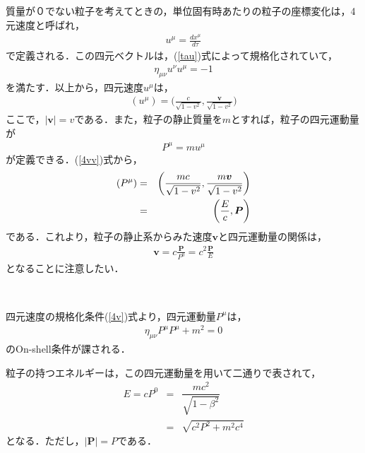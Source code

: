 質量が０でない粒子を考えてときの，単位固有時あたりの粒子の座標変化は，4元速度と呼ばれ，
\begin{eqnarray}
u^{\mu}=\frac{dx^{\mu}}{d\tau}
\end{eqnarray}
で定義される．この四元ベクトルは，(\ref{tau})式によって規格化されていて，
\begin{eqnarray}
\label{4v}
\eta_{\mu\nu}u^{\nu}u^{\mu}=-1
\end{eqnarray}
を満たす．以上から，四元速度$u^{\mu}$は，
\begin{eqnarray}
\label{4vv}
(u^{\mu})=\biggl(\frac{c}{\sqrt{1-v^2}},\frac{\bm{v}}{{\sqrt{1-v^2}}}\biggr)
\end{eqnarray}
ここで，$|\bm{v}|=v$である．また，粒子の静止質量を$m$とすれば，粒子の四元運動量が
\begin{eqnarray}
P^{\mu}=mu^{\mu}
\end{eqnarray}
が定義できる．(\ref{4vv})式から，
\begin{eqnarray}
(P^{\mu})&=&\biggl(\frac{mc}{\sqrt{1-v^2}},\frac{m\bm{v}}{{\sqrt{1-v^2}}}\biggr)  \vspace{4mm} \\
&=&\biggl(\dfrac{E}{c},\bm{P}\biggr)
\end{eqnarray}
である．これより，粒子の静止系からみた速度$\bm{v}$と四元運動量の関係は，
\begin{eqnarray}
\label{vp}
\bm{v}=c\frac{\bm{P}}{P^{0}}=c^2\frac{\bm{P}}{E}
\end{eqnarray}
となることに注意したい．
\begin{empheqboxed}
\

四元速度の規格化条件(\ref{4v})式より，四元運動量$P^{\mu}$は，
\begin{eqnarray}
\label{OS}
\eta_{\mu\nu}P^{\mu}P^{\mu}+m^2=0
\end{eqnarray}
のOn-shell条件が課される．
\end{empheqboxed}

粒子の持つエネルギーは，この四元運動量を用いて二通りで表されて，
\begin{eqnarray}
E=cP^{0}&=&\dfrac{mc^2}{\sqrt{1-\beta^2}} \\
&=&\sqrt{c^2P^2+m^2c^4}
\end{eqnarray}
となる．ただし，$|\bm{P}|=P$である．
